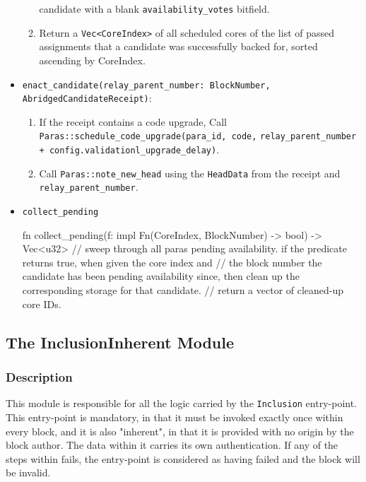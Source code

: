\begin{itemize}
\begin{enumerate}
        candidate with a blank \verb|availability_votes| bitfield.
        \item Return a \verb|Vec<CoreIndex>| of all scheduled cores of the list of
        passed assignments that a candidate was successfully backed for, sorted
        ascending by CoreIndex.
    \end{enumerate}
    \item \verb|enact_candidate(relay_parent_number: BlockNumber, AbridgedCandidateReceipt)|:
    \begin{enumerate}
        \item If the receipt contains a code upgrade, Call \verb|Paras::schedule_code_upgrade(para_id, code,|
        \verb|relay_parent_number + config.validationl_upgrade_delay)|.
        \item Call \verb|Paras::note_new_head| using the \verb|HeadData| from the receipt and
        \verb|relay_parent_number|.
    \end{enumerate}
    \item \verb|collect_pending|
    \begin{verbnobox}[\small]
    fn collect_pending(f: impl Fn(CoreIndex, BlockNumber) -> bool) -> Vec<u32> {
      // sweep through all paras pending availability. if the predicate returns true, when given the core index and
      // the block number the candidate has been pending availability since, then clean up the corresponding storage for that candidate.
      // return a vector of cleaned-up core IDs.
    }
    \end{verbnobox}
\end{itemize}

\subsection{The InclusionInherent Module}

\subsubsection{Description}

This module is responsible for all the logic carried by the \verb|Inclusion|
entry-point. This entry-point is mandatory, in that it must be invoked exactly
once within every block, and it is also "inherent", in that it is provided with
no origin by the block author. The data within it carries its own
authentication. If any of the steps within fails, the entry-point is considered
as having failed and the block will be invalid.
\newline

